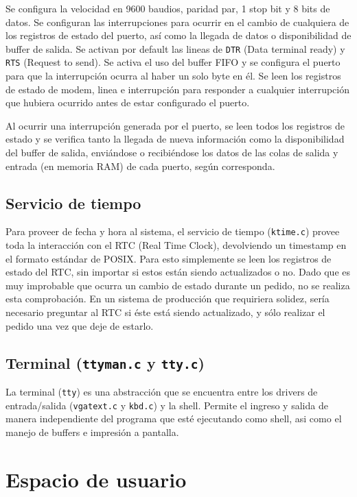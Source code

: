 \documentclass[11pt]{article}
\begin{document}
Se configura la velocidad en 9600 baudios, paridad par, 1 stop bit y 8 bits de datos.
Se configuran las interrupciones para ocurrir en el cambio de cualquiera de los registros de estado del puerto, así como la llegada de datos o disponibilidad de buffer de salida.
Se activan por default las lineas de \texttt{DTR} (Data terminal ready) y \texttt{RTS} (Request to send).
Se activa el uso del buffer FIFO y se configura el puerto para que la interrupción ocurra al haber un solo byte en él.
Se leen los registros de estado de modem, linea e interrupción para responder a cualquier interrupción que hubiera ocurrido antes de estar configurado el puerto.

Al ocurrir una interrupción generada por el puerto, se leen todos los registros de estado y se verifica tanto la llegada de nueva información como la disponibilidad del buffer de salida, enviándose o recibiéndose los datos de las colas de salida y entrada (en memoria RAM) de cada puerto, según corresponda. 

\subsection{Servicio de tiempo}

Para proveer de fecha y hora al sistema, el servicio de tiempo (\texttt{ktime.c}) provee toda la interacción con el RTC (Real Time Clock), devolviendo un timestamp en el formato estándar de POSIX.
Para esto simplemente se leen los registros de estado del RTC, sin importar si estos están siendo actualizados o no. Dado que es muy improbable que ocurra un cambio de estado durante un pedido, no se realiza esta comprobación. En un sistema de producción que requiriera solidez, sería necesario preguntar al RTC si éste está siendo actualizado, y sólo realizar el pedido una vez que deje de estarlo.

\subsection{Terminal (\texttt{ttyman.c} y \texttt{tty.c})}

La terminal (\texttt{tty}) es una abstracción que se encuentra entre los drivers de entrada/salida (\texttt{vgatext.c} y \texttt{kbd.c}) y la shell. Permite el ingreso y salida de manera independiente del programa que esté ejecutando como shell, asi como el manejo de buffers e impresión a pantalla.


\section{Espacio de usuario}
\end{document}
